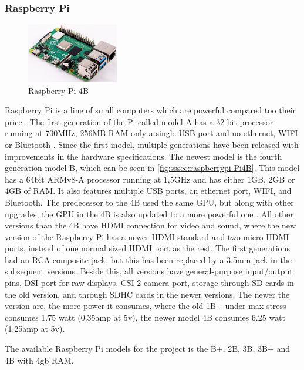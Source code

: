 \subsubsection{Raspberry Pi}
\begin{figure}[H]
  \centering
  \includegraphics[width=4cm]{images/techAnalysis/Pi4B.jpg}
  \caption{Raspberry Pi 4B \cite{RaspberryPI-figure-Pi4b}}\label{fig:sssec:raspberrypi-Pi4B}
\end{figure}
Raspberry Pi is a line of small computers which are powerful compared too their price \cite{raspberry_pi_foundation_raspberry_nodate} \cite{raspberry_pi_foundation_what_nodate}.
The first generation of the Pi called model A has a 32-bit processor running at 700MHz, 256MB RAM only a single USB port and no ethernet, WIFI or Bluetooth \cite{raspberry_pi_foundation_raspberry_nodate} \cite{raspberry_pi_foundation_bcm2835_nodate} \cite{arm_limited_arm11_nodate}.
Since the first model, multiple generations have been released with improvements in the hardware specifications.
The newest model is the fourth generation model B, which can be seen in \autoref{fig:sssec:raspberrypi-Pi4B}.
This model has a 64bit ARMv8-A processor running at 1,5GHz and has either 1GB, 2GB or 4GB of RAM.
It also features multiple USB ports, an ethernet port, WIFI, and Bluetooth.
The predecessor to the 4B used the same GPU, but along with other upgrades, the GPU in the 4B is also updated to a more powerful one \cite{raspberry_pi_foundation_raspberry_2019}.
All other versions than the 4B have HDMI connection for video and sound, where the new version of the Raspberry Pi has a newer HDMI standard and two micro-HDMI ports, instead of one normal sized HDMI port as the rest.
The first generations had an RCA composite jack, but this has been replaced by a 3.5mm jack in the subsequent versions.
Beside this, all versions have general-purpose input/output pins, DSI port for raw displays, CSI-2 camera port, storage through SD cards in the old version, and through SDHC cards in the newer versions.
The newer the version are, the more power it consumes, where the old 1B+ under max stress consumes 1.75 watt (0.35amp at 5v), the newer model 4B consumes 6.25 watt (1.25amp at 5v). \cite{raspberry_pi_foundation_faqs_nodate}

The available Raspberry Pi models for the project is the B+, 2B, 3B, 3B+ and 4B with 4gb RAM.
